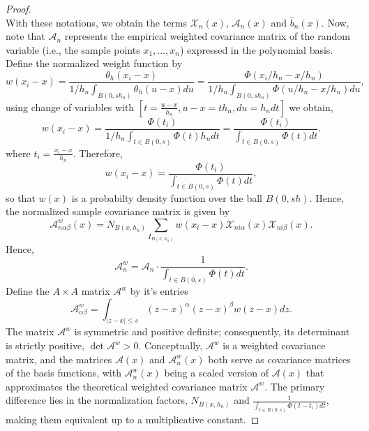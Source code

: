 \documentclass{article}
\begin{document}
\begin{proof}
\begin{equation}
    \label{Anab}
\end{equation}
With these notations, we obtain the terms $\mathscr{X}_n(x)$, $\mathscr{A}_n(x)$  and $\hat{b}_{n }(x)$.
Now, note that $\mathscr{A}_{n}$ represents the empirical weighted covariance matrix of the random variable (i.e., the sample points $x_1,...,x_n$) expressed in the polynomial basis.
Define the normalized weight function by
$$
 w(x_i-x)=\frac{\theta_h(x_i - x)}{1/h_n\int_{B(0, sh_n)} \theta_h(u-x) d u} = \frac{\Phi(x_i/h_n - x/h_n)}{1/h_n\int_{B(0, sh_n)} \Phi(u/h_n-x/h_n) d u},
$$
using change of variables with $\left[t = \frac{u-x}{h_n}, u - x = t h_n, du = h_n dt\right]$ we obtain, 
$$
w(x_i-x)=\frac{\Phi(t_i)}{ 1/h_n\int_{t\in B(0, s)}\Phi(t) h_n dt} = \frac{\Phi(t_i)}{\int_{t\in B(0, s)}\Phi(t) dt}.
$$
where $t_i = \frac{x_i - x}{h_n}$.
Therefore,
\begin{equation}
    w(x_i-x)=\frac{\Phi(t_i)}{\int_{t\in B(0, s)}\Phi(t) dt},
    \label{definition of w(xi-x)}
\end{equation}
so that $w(x)$ is a probabilty density function over the ball $B(0,sh)$.
Hence, the normalized sample covariance matrix is given by
$$\mathscr{A}_{n \alpha \beta}^w(x)=N_{B\left(x, h_n\right)} \sum _{I_{B\left(x, h_n\right)}} w(x_i-x)\mathscr{X}_{n i \alpha}(x) \mathscr{X}_{n i\beta}(x) .$$
Hence,
\begin{equation}
    \mathscr{A}^w_n = \mathscr{A}_n \cdot \frac{1}{\int_{t\in B(0, s)}\Phi(t) dt}.
    \label{const of Anw_An}
\end{equation}
Define the $A\times A$  matrix $\mathscr{A}^w$ by it's entries 
$$
\mathscr{A}^w_{\alpha \beta}={\int_{|z-x| \leq s}(z-x)^\alpha(z-x)^\beta w(z-x) d z}.
$$
The matrix $\mathscr{A}^w$ is symmetric and positive definite; consequently, its determinant is strictly positive, $\operatorname{det} \mathscr{A}^w>0$. Conceptually, $\mathscr{A}^w$ is a weighted covariance matrix, and the matrices $\mathscr{A}(x)$ and $\mathscr{A}^w_n(x)$ both serve as covariance matrices of the basis functions, with $\mathscr{A}^w_n(x)$ being a scaled version of $\mathscr{A}(x)$ that approximates the theoretical weighted covariance matrix $\mathscr{A}^w$. The primary difference lies in the normalization factors, $N_{B\left(x, h_n\right)}$ and $\frac{1}{\int_{t\in B(0, s)}\Phi(t - t_i) dt} $, making them equivalent up to a multiplicative constant.


\end{proof}
\end{document}
